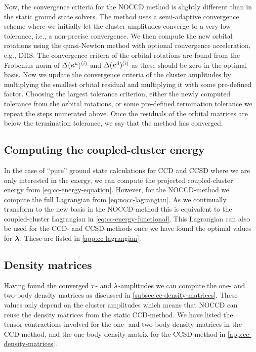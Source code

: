             Now, the convergence criteria for the NOCCD method is slightly
            different than in the static ground state solvers.
            The method uses a semi-adaptive convergence scheme where we
            initially let the cluster amplitudes converge to a very low
            tolerance, i.e., a non-precise convergence.
            We then compute the new orbital rotations using the quasi-Newton
            method with optional convergence acceleration, e.g., DIIS.
            The convergence critera of the orbital rotations are found from the
            Frobenius norm of $\Delta(\kappa^{u})^{(i)}$ and
            $\Delta(\kappa^{d})^{(i)}$ as these should be zero in the optimal
            basis.
            Now we update the convergence criteria of the cluster amplitudes by
            multiplying the smallest orbital residual and multiplying it with
            some pre-defined factor.
            Choosing the largest tolerance criterion, either the newly computed
            tolerance from the orbital rotations, or some pre-defined
            termination tolerance we repeat the steps numerated above.
            Once the residuals of the orbital matrices are below the termination
            tolerance, we say that the method has converged.

        \subsection{Computing the coupled-cluster energy}
            In the case of ``pure'' ground state calculations for CCD and CCSD
            where we are only interested in the energy, we can compute the
            projected coupled-cluster energy from
            \autoref{eq:cc-energy-equation}.
            However, for the NOCCD-method we compute the full Lagrangian from
            \autoref{eq:nocc-lagrangian}.
            As we continually transform to the new basis in the NOCCD-method
            this is equivalent to the coupled-cluster Lagrangian in
            \autoref{eq:cc-energy-functional}.
            This Lagrangian can also be used for the CCD- and CCSD-methods once
            we have found the optimal values for $\boldsymbol{\lambda}$.
            These are listed in \autoref{app:cc-lagrangian}.

        \subsection{Density matrices}
            Having found the converged $\tau$- and $\lambda$-amplitudes
            we can compute the one- and two-body density matrices as discussed
            in \autoref{subsec:cc-density-matrices}.
            These values only depend on the cluster amplitudes which means that
            NOCCD can reuse the density matrices from the static CCD-method.
            We have listed the tensor contractions involved for the one- and
            two-body density matrices in the CCD-method, and the one-body
            density matrix for the CCSD-method in
            \autoref{app:cc-density-matrices}.

